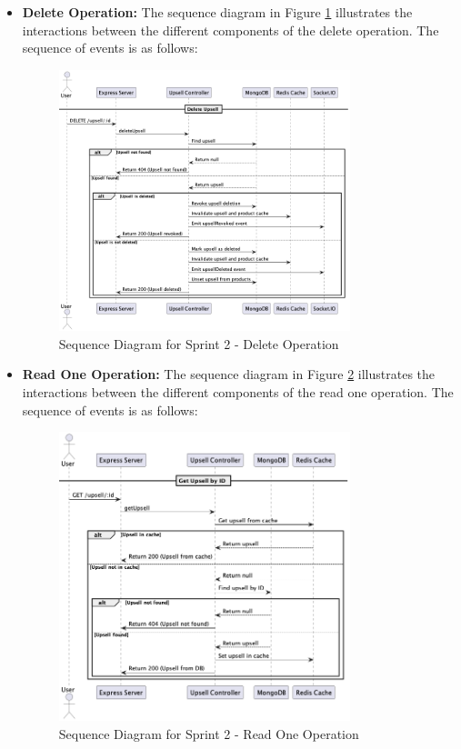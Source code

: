 \begin{itemize}
    \item \textbf{Delete Operation:} The sequence diagram in Figure \ref{fig:sequence_diagram_sprint2_delete} illustrates the interactions between the different components of the delete operation. The sequence of events is as follows:
    \begin{figure}[H]
        \centering
        \includegraphics[width=0.8\textwidth]{images/sprintTwoDeleteSequence.png}
        \caption{Sequence Diagram for Sprint 2 - Delete Operation}
        \label{fig:sequence_diagram_sprint2_delete}
    \end{figure}

    \item \textbf{Read One Operation:} The sequence diagram in Figure \ref{fig:sequence_diagram_sprint2_read_one} illustrates the interactions between the different components of the read one operation. The sequence of events is as follows:
    \begin{figure}[H]
        \centering
        \includegraphics[width=0.8\textwidth]{images/sprintTwoReadOneSequence.png}
        \caption{Sequence Diagram for Sprint 2 - Read One Operation}
        \label{fig:sequence_diagram_sprint2_read_one}
    \end{figure}
\end{itemize}


